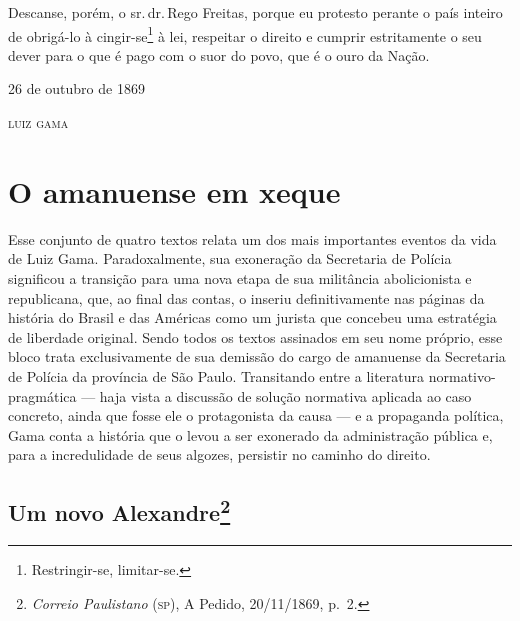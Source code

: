 Descanse, porém, o sr.\,dr.\,Rego Freitas, porque eu protesto perante o
país inteiro de obrigá-lo à cingir-se\footnote{Restringir-se,
  limitar-se.} à lei, respeitar o direito e cumprir estritamente o seu
dever para o que é pago com o suor do povo, que é o ouro da Nação.

\begin{flushright}
26 de outubro de 1869

\textsc{luiz gama}
\end{flushright}

\part{O amanuense em xeque} %

\begin{argumento}
Esse conjunto de quatro textos relata um dos mais importantes eventos da
vida de Luiz Gama. Paradoxalmente, sua exoneração da Secretaria de
Polícia significou a transição para uma nova etapa de sua militância
abolicionista e republicana, que, ao final das contas, o inseriu
definitivamente nas páginas da história do Brasil e das Américas como um
jurista que concebeu uma estratégia de liberdade original. Sendo todos
os textos assinados em seu nome próprio, esse bloco trata exclusivamente
de sua demissão do cargo de amanuense da Secretaria de Polícia da
província de São Paulo. Transitando entre a literatura
normativo-pragmática --- haja vista a discussão de solução normativa
aplicada ao caso concreto, ainda que fosse ele o protagonista da causa
--- e a propaganda política, Gama conta a história que o levou a ser
exonerado da administração pública e, para a incredulidade de seus
algozes, persistir no caminho do direito.
\end{argumento}

\chapter{Um novo Alexandre\footnote{\emph{Correio Paulistano} (\textsc{sp}), A
  Pedido, 20/11/1869, p.~2.}}

